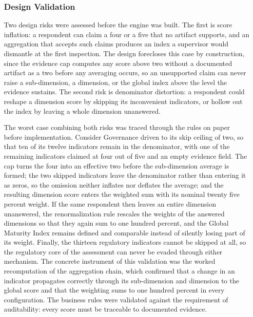 \subsubsection{Design Validation}

Two design risks were assessed before the engine was built. The first is score inflation: a respondent can claim a four or a five that no artifact supports, and an aggregation that accepts such claims produces an index a supervisor would dismantle at the first inspection. The design forecloses this case by construction, since the evidence cap computes any score above two without a documented artifact as a two before any averaging occurs, so an unsupported claim can never raise a sub-dimension, a dimension, or the global index above the level the evidence sustains. The second risk is denominator distortion: a respondent could reshape a dimension score by skipping its inconvenient indicators, or hollow out the index by leaving a whole dimension unanswered.

The worst case combining both risks was traced through the rules on paper before implementation. Consider Governance driven to its skip ceiling of two, so that ten of its twelve indicators remain in the denominator, with one of the remaining indicators claimed at four out of five and an empty evidence field. The cap turns the four into an effective two before the sub-dimension average is formed; the two skipped indicators leave the denominator rather than entering it as zeros, so the omission neither inflates nor deflates the average; and the resulting dimension score enters the weighted sum with its nominal twenty five percent weight. If the same respondent then leaves an entire dimension unanswered, the renormalization rule rescales the weights of the answered dimensions so that they again sum to one hundred percent, and the Global Maturity Index remains defined and comparable instead of silently losing part of its weight. Finally, the thirteen regulatory indicators cannot be skipped at all, so the regulatory core of the assessment can never be evaded through either mechanism. The concrete instrument of this validation was the worked recomputation of the aggregation chain, which confirmed that a change in an indicator propagates correctly through its sub-dimension and dimension to the global score and that the weighting sums to one hundred percent in every configuration. The business rules were validated against the requirement of auditability: every score must be traceable to documented evidence.


